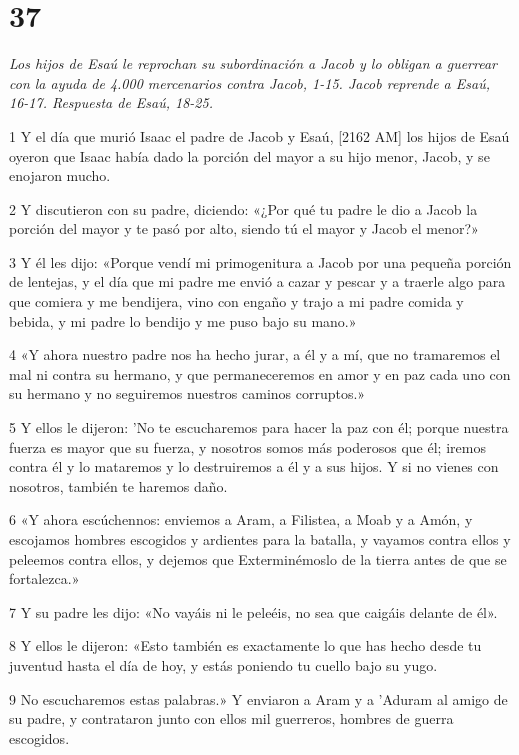\chapter{37}

\par \textit{Los hijos de Esaú le reprochan su subordinación a Jacob y lo obligan a guerrear con la ayuda de 4.000 mercenarios contra Jacob, 1-15. Jacob reprende a Esaú, 16-17. Respuesta de Esaú, 18-25.}

\par 1 Y el día que murió Isaac el padre de Jacob y Esaú, [2162 AM] los hijos de Esaú oyeron que Isaac había dado la porción del mayor a su hijo menor, Jacob, y se enojaron mucho.
\par 2 Y discutieron con su padre, diciendo: «¿Por qué tu padre le dio a Jacob la porción del mayor y te pasó por alto, siendo tú el mayor y Jacob el menor?»
\par 3 Y él les dijo: «Porque vendí mi primogenitura a Jacob por una pequeña porción de lentejas, y el día que mi padre me envió a cazar y pescar y a traerle algo para que comiera y me bendijera, vino con engaño y trajo a mi padre comida y bebida, y mi padre lo bendijo y me puso bajo su mano.»
\par 4 «Y ahora nuestro padre nos ha hecho jurar, a él y a mí, que no tramaremos el mal ni contra su hermano, y que permaneceremos en amor y en paz cada uno con su hermano y no seguiremos nuestros caminos corruptos.»
\par 5 Y ellos le dijeron: 'No te escucharemos para hacer la paz con él; porque nuestra fuerza es mayor que su fuerza, y nosotros somos más poderosos que él; iremos contra él y lo mataremos y lo destruiremos a él y a sus hijos. Y si no vienes con nosotros, también te haremos daño.
\par 6 «Y ahora escúchennos: enviemos a Aram, a Filistea, a Moab y a Amón, y escojamos hombres escogidos y ardientes para la batalla, y vayamos contra ellos y peleemos contra ellos, y dejemos que Exterminémoslo de la tierra antes de que se fortalezca.»
\par 7 Y su padre les dijo: «No vayáis ni le peleéis, no sea que caigáis delante de él».
\par 8 Y ellos le dijeron: «Esto también es exactamente lo que has hecho desde tu juventud hasta el día de hoy, y estás poniendo tu cuello bajo su yugo.
\par 9 No escucharemos estas palabras.» Y enviaron a Aram y a 'Aduram al amigo de su padre, y contrataron junto con ellos mil guerreros, hombres de guerra escogidos.
